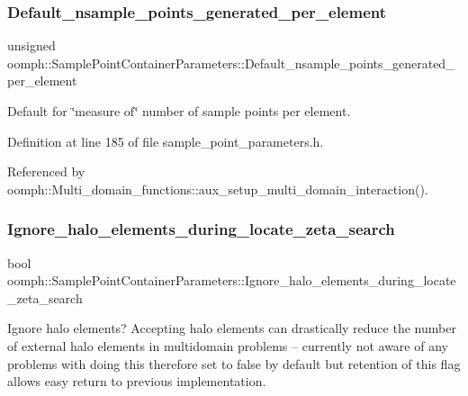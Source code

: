 \subsubsection{\texorpdfstring{Default\+\_\+nsample\+\_\+points\+\_\+generated\+\_\+per\+\_\+element}{Default\_nsample\_points\_generated\_per\_element}}
{\footnotesize\ttfamily unsigned oomph\+::\+Sample\+Point\+Container\+Parameters\+::\+Default\+\_\+nsample\+\_\+points\+\_\+generated\+\_\+per\+\_\+element\hspace{0.3cm}{\ttfamily [static]}}



Default for \char`\"{}measure of\char`\"{} number of sample points per element. 



Definition at line 185 of file sample\+\_\+point\+\_\+parameters.\+h.



Referenced by oomph\+::\+Multi\+\_\+domain\+\_\+functions\+::aux\+\_\+setup\+\_\+multi\+\_\+domain\+\_\+interaction().

\mbox{\label{classoomph_1_1SamplePointContainerParameters_ad6ba2b667c746fc6c66830e4f3dc3f70}} 
\subsubsection{\texorpdfstring{Ignore\+\_\+halo\+\_\+elements\+\_\+during\+\_\+locate\+\_\+zeta\+\_\+search}{Ignore\_halo\_elements\_during\_locate\_zeta\_search}}
{\footnotesize\ttfamily bool oomph\+::\+Sample\+Point\+Container\+Parameters\+::\+Ignore\+\_\+halo\+\_\+elements\+\_\+during\+\_\+locate\+\_\+zeta\+\_\+search\hspace{0.3cm}{\ttfamily [protected]}}



Ignore halo elements? Accepting halo elements can drastically reduce the number of external halo elements in multidomain problems -- currently not aware of any problems with doing this therefore set to false by default but retention of this flag allows easy return to previous implementation. 



